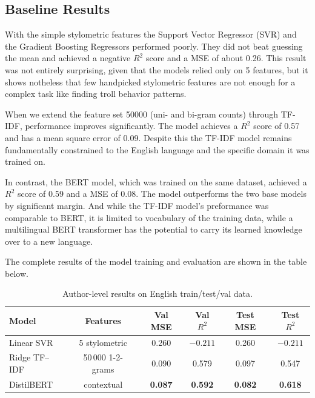 \documentclass[twoside]{ctuthesis}
\theoremstyle{plain}
\theoremstyle{definition}
\theoremstyle{note}
\begin{document}
\subsection{Baseline Results}

With the simple stylometric features the Support Vector Regressor (SVR) and the Gradient Boosting Regressors performed poorly. They did not beat guessing the mean and achieved a negative $R^2$ score and a MSE of about 0.26. This result was not entirely surprising, given that the models relied only on 5 features, but it shows notheless that few handpicked stylometric features are not enough for a complex task like finding troll behavior patterns.\par
When we extend the feature set 50000 (uni- and bi-gram counts) through TF-IDF, performance improves significantly. The model achieves a $R^2$ score of 0.57 and has a mean square error of 0.09. Despite this the TF-IDF model remains fundamentally constrained to the English language and the specific domain it was trained on.\par
In contrast, the BERT model, which was trained on the same dataset, achieved a $R^2$ score of 0.59 and a MSE of 0.08. The model outperforms the two base models by significant margin. And while the TF-IDF model's preformance was comparable to BERT, it is limited to vocabulary of the training data, while a multilingual BERT transformer has the potential to carry its learned knowledge over to a new language.\par
The complete results of the model training and evaluation are shown in the table below.\par

\begin{table}[ht]
	\centering
	\caption{Author-level results on English train/test/val data.}
	\label{tab:en_author_results}
	\begin{tabular}{lccccc}
	  \hline
	  \textbf{Model} & \textbf{Features} &
	  \textbf{Val MSE} & \textbf{Val $R^{2}$} &
	  \textbf{Test MSE} & \textbf{Test $R^{2}$} \\
	  \hline
	  Linear SVR & 5 stylometric          & 0.260 & $-0.211$ & 0.260 & $-0.211$ \\
	  Ridge TF--IDF & 50\,000 1-2-grams   & 0.090 & 0.579   & 0.097 & 0.547    \\
	  DistilBERT & contextual   & \textbf{0.087} & \textbf{0.592} &
										   \textbf{0.082} & \textbf{0.618} \\
	  \hline
	\end{tabular}
\end{table}
\end{document}
